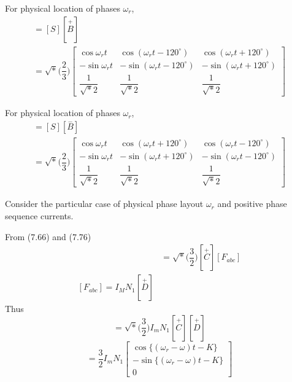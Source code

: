 \documentclass[a4paper,numbers=noenddot,12pt]{scrbook}
\begin{document}
        For physical location of phases $\omega_r$,
        \begin{multline}
            [\overset{+}{C}] = [S] [\overset{+}{B}] \\
            = \sqrt*{\Big( \dfrac{2}{3} \Big)}
            \begin{bmatrix}
                \cos \omega_r t & \cos (\omega_r t - 120^{\circ}) & \cos (\omega_r t + 120^{\circ}) \\
                - \sin \omega_r t & - \sin (\omega_r t - 120^{\circ}) & - \sin (\omega_r t + 120^{\circ}) \\
                \dfrac{1}{\sqrt*{2}} & \dfrac{1}{\sqrt*{2}} & \dfrac{1}{\sqrt*{2}}
            \end{bmatrix}
            \label{eq:Eq7.82}
        \end{multline}

        For physical location of phases $\omega_r$,  %
        \begin{multline}
            [\overset{-}{C}] = [S] [\overset{-}{B}] \\
            = \sqrt*{\Big( \dfrac{2}{3} \Big)}
            \begin{bmatrix}
                \cos \omega_r t & \cos (\omega_r t + 120^{\circ}) & \cos (\omega_r t - 120^{\circ}) \\
                - \sin \omega_r t & - \sin (\omega_r t + 120^{\circ}) & - \sin (\omega_r t - 120^{\circ}) \\
                \dfrac{1}{\sqrt*{2}} & \dfrac{1}{\sqrt*{2}} & \dfrac{1}{\sqrt*{2}}
            \end{bmatrix}
            \label{eq:Eq7.83}
        \end{multline}

        Consider the particular  case of physical phase layout $\omega_r$ and positive phase sequence currents. %

        From (7.66) and  (7.76)
        \begin{align}
            [F_{d q \gamma}] &=  \sqrt*{\Big( \dfrac{3}{2} \Big)} [\overset{+}{C}] [F_{abc}] \\
            [F_{abc}] = I_M N_1 [\overset{+}{D}]
            \label{eq:Eq7.85}
        \end{align}
        Thus
        \begin{equation}
            [F_{d q \gamma}] =  \sqrt*{\Big( \dfrac{3}{2} \Big)} I_m N_1 [\overset{+}{C}] [\overset{+}{D}]
            \label{eq:Eq7.86}
        \end{equation}
        \begin{equation}
            [F_{d q \gamma}] = \dfrac{3}{2} I_m N_1
            \begin{bmatrix}
                \cos \{(\omega_r -\omega)t - K\} \\
                -\sin \{(\omega_r -\omega)t - K\} \\
                0
            \end{bmatrix}
            \label{eq:Eq7.87}
        \end{equation}
\end{document}

